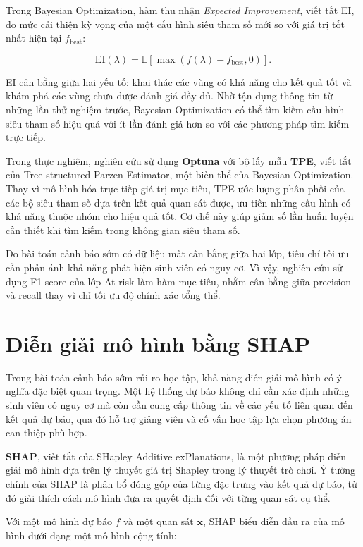 \documentclass[a4paper]{report}
\begin{document}
Trong Bayesian Optimization, hàm thu nhận \textit{Expected Improvement}, viết
tắt EI, đo mức cải thiện kỳ vọng của một cấu hình siêu tham số mới so với giá
trị tốt nhất hiện tại $f_{\text{best}}$:

\[
  \text{EI}(\lambda)
  =
  \mathbb{E}
  \left[
    \max(f(\lambda)-f_{\text{best}},0)
  \right].
\]

EI cân bằng giữa hai yếu tố: khai thác các vùng có khả năng cho kết quả tốt và
khám phá các vùng chưa được đánh giá đầy đủ. Nhờ tận dụng thông tin từ những
lần thử nghiệm trước, Bayesian Optimization có thể tìm kiếm cấu hình siêu tham
số hiệu quả với ít lần đánh giá hơn so với các phương pháp tìm kiếm trực tiếp.

Trong thực nghiệm, nghiên cứu sử dụng \textbf{Optuna} với bộ lấy mẫu
\textbf{TPE}, viết tắt của Tree-structured Parzen Estimator, một biến thể của
Bayesian Optimization. Thay vì mô hình hóa trực tiếp giá trị mục tiêu, TPE ước lượng
phân phối của các bộ siêu tham số dựa trên kết quả quan sát được, ưu tiên những
cấu hình có khả năng thuộc nhóm cho hiệu quả tốt. Cơ chế này giúp giảm số lần
huấn luyện cần thiết khi tìm kiếm trong không gian siêu tham số.

Do bài toán cảnh báo sớm có dữ liệu mất cân bằng giữa hai lớp, tiêu chí tối ưu
cần phản ánh khả năng phát hiện sinh viên có nguy cơ. Vì vậy, nghiên cứu sử
dụng F1-score của lớp At-risk làm hàm mục tiêu, nhằm cân bằng giữa precision và
recall thay vì chỉ tối ưu độ chính xác tổng thể.

\section{Diễn giải mô hình bằng SHAP}
\label{sec:shap_theory}

Trong bài toán cảnh báo sớm rủi ro học tập, khả năng diễn giải mô hình có ý
nghĩa đặc biệt quan trọng. Một hệ thống dự báo không chỉ cần xác định những
sinh viên có nguy cơ mà còn cần cung cấp thông tin về các yếu tố liên quan đến
kết quả dự báo, qua đó hỗ trợ giảng viên và cố vấn học tập lựa chọn phương án
can thiệp phù hợp.

\textbf{SHAP}, viết tắt của SHapley Additive exPlanations, là một phương pháp
diễn giải mô hình dựa trên lý thuyết giá trị Shapley trong lý thuyết trò chơi.
Ý tưởng chính của SHAP là phân bổ đóng góp của từng đặc trưng vào kết quả dự
báo, từ đó giải thích cách mô hình đưa ra quyết định đối với từng quan sát cụ
thể.

Với một mô hình dự báo $f$ và một quan sát $\mathbf{x}$, SHAP biểu diễn đầu ra
của mô hình dưới dạng một mô hình cộng tính:
\end{document}
